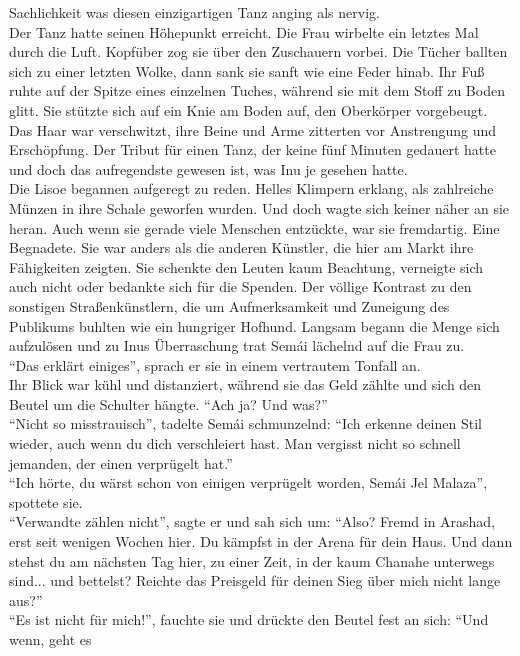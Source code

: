 Sachlichkeit was diesen einzigartigen Tanz anging als nervig.\\
Der Tanz hatte seinen Höhepunkt erreicht. Die Frau wirbelte ein letztes Mal durch die Luft. 
Kopfüber zog sie über den Zuschauern vorbei. Die Tücher ballten sich zu einer letzten Wolke, dann 
sank sie sanft wie eine Feder hinab. Ihr Fuß ruhte auf der Spitze eines einzelnen Tuches, während 
sie mit dem Stoff zu Boden glitt. Sie stützte sich auf ein Knie am Boden auf, den Oberkörper 
vorgebeugt. Das Haar war verschwitzt, ihre Beine und Arme zitterten vor Anstrengung und 
Erschöpfung. Der Tribut für einen Tanz, der keine fünf Minuten gedauert hatte und doch das 
aufregendste gewesen ist, was Inu je gesehen hatte.\\
Die Lisoe begannen aufgeregt zu reden. Helles Klimpern erklang, als zahlreiche Münzen in ihre 
Schale geworfen wurden. Und doch wagte sich keiner näher an sie heran. Auch wenn sie gerade viele 
Menschen entzückte, war sie fremdartig. Eine Begnadete. Sie war anders als die anderen Künstler, 
die hier am Markt ihre Fähigkeiten zeigten. Sie schenkte den Leuten kaum Beachtung, verneigte sich 
auch nicht oder bedankte sich für die Spenden. Der völlige Kontrast zu den sonstigen 
Straßenkünstlern, die um Aufmerksamkeit und Zuneigung des Publikums buhlten wie ein hungriger 
Hofhund. Langsam begann die Menge sich aufzulösen und zu Inus Überraschung trat Semái lächelnd auf 
die Frau zu.\\
``Das erklärt einiges'', sprach er sie in einem vertrautem Tonfall an. \\
Ihr Blick war kühl und distanziert, während sie das Geld zählte und sich den Beutel um die Schulter 
hängte. ``Ach ja? Und was?''\\
``Nicht so misstrauisch'', tadelte Semái schmunzelnd: ``Ich erkenne deinen Stil wieder, auch wenn 
du dich verschleiert hast. Man vergisst nicht so schnell jemanden, der einen verprügelt hat.''\\
``Ich hörte, du wärst schon von einigen verprügelt worden, Semái Jel Malaza'', spottete sie. \\
``Verwandte zählen nicht'', sagte er und sah sich um: ``Also? Fremd in Arashad, erst seit wenigen 
Wochen hier. Du kämpfst in der Arena für dein Haus. Und dann stehst du am nächsten Tag hier, zu 
einer Zeit, in der kaum Chanahe unterwegs sind... und bettelst? Reichte das Preisgeld für deinen 
Sieg über mich nicht lange aus?''\\
``Es ist nicht für mich!'', fauchte sie und drückte den Beutel fest an sich: ``Und wenn, geht es 
